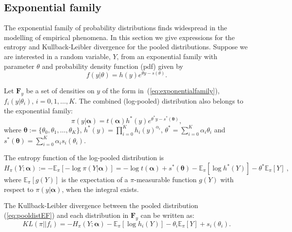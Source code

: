 \documentclass[a4paper, notitlepage, 10pt]{article}
\begin{document}
\subsection{Exponential family}
\label{sec:expofamily}

The exponential family of probability distributions finds widespread in the modelling of empirical phenomena.
In this section we give expressions for the entropy and Kullback-Leibler divergence for the pooled distributions. 
Suppose we are interested in a random variable, $Y$, from an exponential family with parameter $\theta$ and probability density function (pdf) given by
\begin{equation}
\label{eq:exponentialfamily}
f(y|\theta) = h(y) e^{\theta y - s(\theta)}.
\end{equation}

Let $\mathbf{F}_{y}$ be a set of densities on $y$ of the form in~(\ref{eq:exponentialfamily}), $f_i(y|\theta_i)$, $ i = 0, 1, \ldots, K$. 
The combined (log-pooled) distribution also belongs to the exponential family:
\begin{equation}
\label{eq:pooldistEF}
\pi(y| \boldsymbol\alpha ) = t(\boldsymbol\alpha) h^\ast (y) e^{\theta^\ast y - s^\ast (\boldsymbol\theta)},
\end{equation}
where $\boldsymbol\theta :=\{\theta_0, \theta_1, \ldots, \theta_K \}$, $h^\ast (y) = \prod_{i = 0}^K h_i(y)^{\alpha_i}$,  $\theta^\ast = \sum_{i = 0}^K \alpha_i \theta_i$ and $s^\ast (\boldsymbol\theta) = \sum_{i = 0}^K \alpha_i s_i(\theta_i)$.

The entropy function of the log-pooled distribution is
\begin{equation}
\label{eq:entropydistEF}
H_\pi(Y; \boldsymbol\alpha) :=  - \mathbb{E}_{\pi}\left[-\log \pi(Y | \boldsymbol\alpha) \right] = -\log t(\boldsymbol\alpha) + s^\ast (\boldsymbol\theta) - \mathbb{E}_\pi[\log h^\ast (Y)] - \theta^\ast \mathbb{E}_\pi[Y] \: ,
\end{equation}
where $\mathbb{E}_{\pi}\left[ g(Y) \right]$ is the expectation of a $\pi$-measurable function $g(Y)$ with respect to $\pi( y | \boldsymbol\alpha)$, when the integral exists.

The Kullback-Leibler divergence between the pooled distribution (\ref{eq:pooldistEF}) and each distribution in $\mathbf{F}_{y}$ can be written as:
\begin{equation}
\label{eq:KLdistEF}
KL(\pi || f_i )  =  - H_\pi(Y; \boldsymbol\alpha) - \mathbb{E}_\pi[\log h_i(Y)] - \theta_i \mathbb{E}_\pi[Y] + s_i(\theta_i).
\end{equation}
\end{document}
